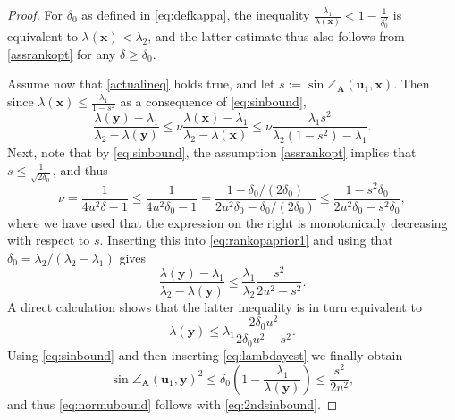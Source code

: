\documentclass[10pt,a4paper]{amsart}
\newcommand{\A}{\ten A}
\newcommand{\ten}[1]{\boldsymbol{#1}}
\begin{document}
\begin{proof}
For $\delta_0$ as defined in \eqref{eq:defkappa}, the inequality $\frac{\lambda_1}{\lambda(\ten x)} < 1 - \frac{1}{\delta_0^{2}}$ is equivalent to $\lambda(\ten x) < \lambda_2$, 
and the latter estimate thus also follows from \eqref{assrankopt} for any $\delta \geq \delta_0$.

 Assume now that \cref{actualineq} holds true, and let $s := \sin \angle_{\A}(\ten u_1,\ten x)$. Then since $\lambda(\ten{x}) \leq \frac{\lambda_1}{1 - s^2}$ as a consequence of  \cref{eq:sinbound}, 
 \begin{equation}\label{eq:rankopaprior1}
    \frac{\lambda(\ten{y}) - \lambda_1}{\lambda_2 - \lambda(\ten{y})}\leq \nu  \frac{\lambda(\ten{x}) - \lambda_1}{\lambda_2 - \lambda(\ten{x})}
     \leq \nu \frac{\lambda_1 s^2}{\lambda_2 (1 - s^2) - \lambda_1} .
 \end{equation}
 Next, note that by \cref{eq:sinbound}, the assumption \cref{assrankopt} implies that $s \leq \frac{1}{\sqrt{2 \delta_0}}$, and thus 
 \begin{equation}\label{eq:rankopaprior2}
\nu =   \frac{1}{4 u^2 \delta  - 1} \leq \frac{1}{4 u^2 \delta_0  - 1} =  \frac{1 - \delta_0 / (2 \delta_0)}{2u^2 \delta_0 - \delta_0 / (2 \delta_0)}  \leq  \frac{1 - s^2 \delta_0}{2u^2 \delta_0 - s^2  \delta_0},
 \end{equation}
 where we have used that the expression on the right is monotonically decreasing with respect to $s$. Inserting this into \eqref{eq:rankopaprior1} and using that $\delta_0 =\lambda_2 /(\lambda_2 - \lambda_1)$ gives
 \[
      \frac{\lambda(\ten{y}) - \lambda_1}{\lambda_2 - \lambda(\ten{y})} \leq  \frac{\lambda_1}{\lambda_2}\frac{s^2}{2u^2 - s^2} .
 \]
A direct calculation shows that the latter inequality is in turn equivalent to
\begin{equation}\label{eq:lambdayest}
 \lambda(\ten{y}) \leq \lambda_1 \frac{2 \delta_0 u^2}{2 \delta_0 u^2 - s^2}.
\end{equation}
Using \cref{eq:sinbound} and then inserting \eqref{eq:lambdayest} we finally obtain
\begin{equation*}
\sin \angle_{\A}(\ten u_1,\ten y)^2  \leq \delta_0 \left( 1 - \frac{\lambda_1}{\lambda(\ten y)} \right) 
%
%
%
%
  \leq   \frac{s^2}{2 u^2},
\end{equation*}
and thus \cref{eq:normubound} follows with \cref{eq:2ndsinbound}.
\end{proof}
\end{document}

